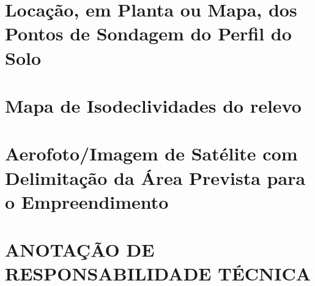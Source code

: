 \chapter{Locação, em Planta ou Mapa, dos Pontos de Sondagem do Perfil do Solo}
\label{chap:sondagem}
\clearpage



\chapter{Mapa de Isodeclividades do relevo}
\label{chap:declividade}
\clearpage


\chapter{Aerofoto/Imagem de Satélite com Delimitação da Área Prevista para o Empreendimento}
\label{chap:delimitacao}
\clearpage

\chapter{ANOTAÇÃO DE RESPONSABILIDADE TÉCNICA}

